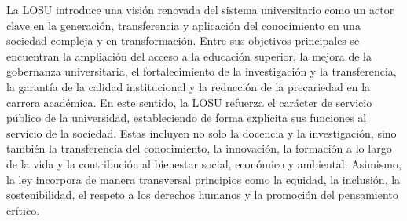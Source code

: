 \documentclass[
  11pt,
  a4paper,
  twoside]{scrreprt}
\begin{document}
La LOSU introduce una visión renovada del sistema universitario como un
actor clave en la generación, transferencia y aplicación del
conocimiento en una sociedad compleja y en transformación. Entre sus
objetivos principales se encuentran la ampliación del acceso a la
educación superior, la mejora de la gobernanza universitaria, el
fortalecimiento de la investigación y la transferencia, la garantía de
la calidad institucional y la reducción de la precariedad en la carrera
académica. En este sentido, la LOSU refuerza el carácter de servicio
público de la universidad, estableciendo de forma explícita sus
funciones al servicio de la sociedad. Estas incluyen no solo la docencia
y la investigación, sino también la transferencia del conocimiento, la
innovación, la formación a lo largo de la vida y la contribución al
bienestar social, económico y ambiental. Asimismo, la ley incorpora de
manera transversal principios como la equidad, la inclusión, la
sostenibilidad, el respeto a los derechos humanos y la promoción del
pensamiento crítico.
\end{document}
